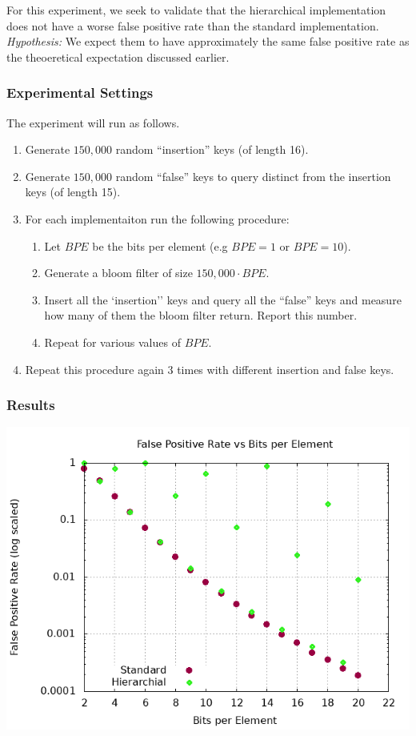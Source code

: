 For this experiment, we seek to validate that the hierarchical implementation does not have a worse false positive rate than the standard implementation.
\textit{Hypothesis:} We expect them to have approximately the same false positive rate as the theoeretical expectation discussed earlier.

\subsubsection{Experimental Settings}

The experiment will run as follows. 
\begin{enumerate}
\item Generate $150,000$ random ``insertion'' keys (of length 16).
\item Generate $150,000$ random ``false'' keys to query distinct from the insertion keys (of length 15).
\item For each implementaiton run the following procedure:
\begin{enumerate}
    \item Let $BPE$ be the bits per element (e.g $BPE = 1$ or $BPE = 10$).
    \item Generate a bloom filter of size $150,000\cdot BPE$.
    \item Insert all the `insertion'' keys and query all the ``false'' keys and measure how many of them the bloom filter return. Report this number.
    \item Repeat for various values of $BPE$.
\end{enumerate}
\item Repeat this procedure again $3$ times with different insertion and false keys.
\end{enumerate}

\subsubsection{Results}
\begin{center}
    \includegraphics[width=14cm]{plots/fp.png}
\end{center}

